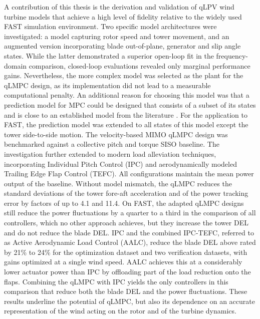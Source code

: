 A contribution of this thesis is the derivation and validation of qLPV wind turbine models that achieve a high level of fidelity relative to the widely used FAST simulation environment. Two specific model architectures were investigated: a model capturing rotor speed and tower movement, and an augmented version incorporating blade out-of-plane, generator and slip angle states. While the latter demonstrated a superior open-loop fit in the frequency-domain comparison, closed-loop evaluations revealed only marginal performance gains. Nevertheless, the more complex model was selected as the plant for the qLMPC design, as its implementation did not lead to a measurable computational penalty. An additional reason for choosing this model was that a prediction model for MPC could be designed that consists of a subset of its states and is close to an established model from the literature \cite{Bianchi2007}. For the application to FAST, the prediction model was extended to all states of this model except the tower side-to-side motion. The velocity-based MIMO qLMPC design was benchmarked against a collective pitch and torque SISO baseline. The investigation further extended to modern load alleviation techniques, incorporating Individual Pitch Control (IPC) and aerodynamically modeled Trailing Edge Flap Control (TEFC). All configurations maintain the mean power output of the baseline. Without model mismatch, the qLMPC reduces the standard deviations of the tower fore-aft acceleration and of the power tracking error by factors of up to 4.1 and 11.4. On FAST, the adapted qLMPC designs still reduce the power fluctuations by a quarter to a third in the comparison of all controllers, which no other approach achieves, but they increase the tower DEL and do not reduce the blade DEL. IPC and the combined IPC-TEFC, referred to as Active Aerodynamic Load Control (AALC), reduce the blade DEL above rated by 21\% to 24\% for the optimization dataset and two verification datasets, with gains optimized at a single wind speed. AALC achieves this at a considerably lower actuator power than IPC by offloading part of the load reduction onto the flaps. Combining the qLMPC with IPC yields the only controllers in this comparison that reduce both the blade DEL and the power fluctuations. These results underline the potential of qLMPC, but also its dependence on an accurate representation of the wind acting on the rotor and of the turbine dynamics.
%
